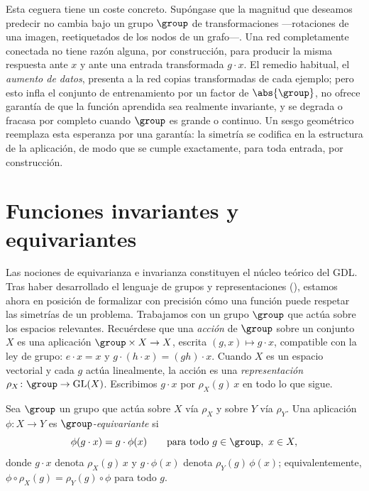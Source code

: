 Esta ceguera tiene un coste concreto. Sup\'ongase que la magnitud que deseamos
predecir no cambia bajo un grupo $\group$ de transformaciones ---rotaciones de
una imagen, reetiquetados de los nodos de un grafo---. Una red completamente
conectada no tiene raz\'on alguna, por construcci\'on, para producir la misma
respuesta ante $x$ y ante una entrada transformada $g \cdot x$. El remedio
habitual, el \emph{aumento de datos}, presenta a la red copias transformadas de
cada ejemplo; pero esto infla el conjunto de entrenamiento por un factor de
$\abs{\group}$, no ofrece garant\'ia de que la funci\'on aprendida sea realmente
invariante, y se degrada o fracasa por completo cuando $\group$ es grande o
continuo. Un sesgo geom\'etrico reemplaza esta esperanza por una garant\'ia: la
simetr\'ia se codifica en la estructura de la aplicaci\'on, de modo que se
cumple exactamente, para toda entrada, por construcci\'on.

\section{Funciones invariantes y equivariantes}
\label{sec:priors:inv-equi}

Las nociones de equivarianza e invarianza constituyen el n\'ucleo te\'orico del
GDL. Tras haber desarrollado el lenguaje de grupos y representaciones
(), estamos ahora en posici\'on de formalizar con precisi\'on
c\'omo una funci\'on puede respetar las simetr\'ias de un problema. Trabajamos con
un grupo $\group$ que act\'ua sobre los espacios relevantes. Recu\'erdese que una
\emph{acci\'on} de $\group$ sobre un conjunto $X$ es una aplicaci\'on
$\group \times X \to X$, escrita $(g, x) \mapsto g \cdot x$, compatible con la ley
de grupo: $e \cdot x = x$ y $g \cdot (h \cdot x) = (gh) \cdot x$. Cuando $X$ es un
espacio vectorial y cada $g$ act\'ua linealmente, la acci\'on es una
\emph{representaci\'on} $\rho_X \colon \group \to \GL(X)$. Escribimos $g \cdot x$
por $\rho_X(g)\, x$ en todo lo que sigue.

\begin{definition}
\label{def:priors:equivariance}
Sea $\group$ un grupo que act\'ua sobre $X$ v\'ia $\rho_X$ y sobre $Y$ v\'ia
$\rho_Y$. Una aplicaci\'on $\phi \colon X \to Y$ es \emph{$\group$-equivariante}
si
\[
  \phi(g \cdot x) = g \cdot \phi(x)
  \qquad \text{para todo } g \in \group,\ x \in X,
\]
donde $g \cdot x$ denota $\rho_X(g)\, x$ y $g \cdot \phi(x)$ denota
$\rho_Y(g)\, \phi(x)$; equivalentemente,
$\phi \circ \rho_X(g) = \rho_Y(g) \circ \phi$ para todo $g$.
\end{definition}


